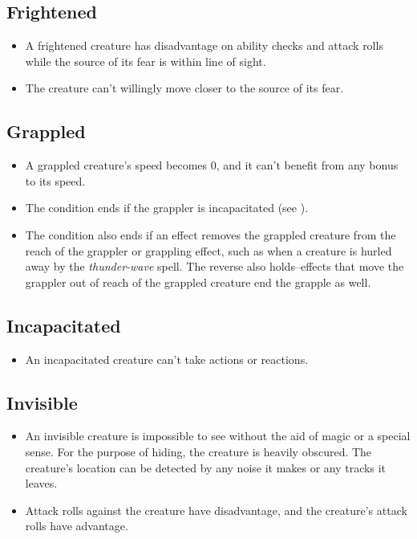 \subsection{Frightened\label{condition:frightened}}
\begin{itemize}
\item A frightened creature has disadvantage on ability checks and attack rolls while the source of its fear is within line of sight.
\item The creature can't willingly move closer to the source of its fear.
\end{itemize}

\subsection{Grappled\label{condition:grappled}}
\begin{itemize}
\item A grappled creature's speed becomes 0, and it can't benefit from any bonus to its speed.
\item The condition ends if the grappler is incapacitated (see ).
\item The condition also ends if an effect removes the grappled creature from the reach of the grappler or grappling effect, such as when a creature is hurled away by the \textit{thunder-wave} spell. The reverse also holds--effects that move the grappler out of reach of the grappled creature end the grapple as well.
\end{itemize}

\subsection{Incapacitated\label{condition:incapacitated}}
\begin{itemize}
\item An incapacitated creature can't take actions or reactions.
\end{itemize}

\subsection{Invisible\label{condition:invisible}}
\begin{itemize}
\item An invisible creature is impossible to see without the aid of magic or a special sense. For the purpose of hiding, the creature is heavily obscured. The creature's location can be detected by any noise it makes or any tracks it leaves.
\item Attack rolls against the creature have disadvantage, and the creature's attack rolls have advantage.
\end{itemize}

